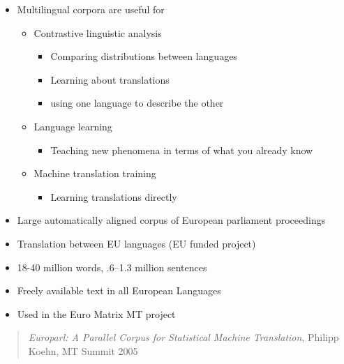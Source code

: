 \documentclass[a4paper,landscape,headrule,footrule,xetex]{foils}
\begin{document}

\begin{itemize}
\item Multilingual corpora are useful for
  \begin{itemize}
  \item Contrastive linguistic analysis
    \begin{itemize}
    \item Comparing distributions between languages
    \item Learning about translations
    \item using one language to describe the other
    \end{itemize}
  \item Language learning
    \begin{itemize}
    \item Teaching new phenomena in terms of what you already know
    \end{itemize}
  \item Machine translation training
    \begin{itemize}
    \item Learning translations directly
    \end{itemize}
  \end{itemize}
\end{itemize}


\begin{itemize}
\item Large automatically aligned corpus of European parliament proceedings
  \item Translation between EU languages (EU funded project)
  \item 18-40 million words, .6--1.3 million sentences
  \item Freely available text in all European Languages
  \item Used in the Euro Matrix MT project
\end{itemize}
\begin{quote}
  \textit{Europarl: A Parallel Corpus for Statistical Machine Translation}, Philipp Koehn, MT Summit 2005
\end{quote}



  \MyLogo{}
\begin{center}
\end{center}
\end{document}
